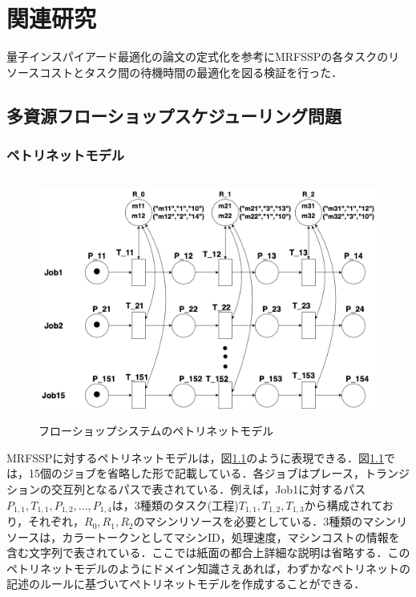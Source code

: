\chapter{関連研究}
\label{chap:poordirection}
量子インスパイアード最適化の論文\cite{shinjo}の定式化を参考にMRFSSPの各タスクのリソースコストとタスク間の待機時間の最適化を図る検証を行った．
\section{多資源フローショップスケジューリング問題}

\subsection{ペトリネットモデル}

\begin{figure}[H]
    \centering
    \includegraphics[width=0.8\linewidth, height=8cm]{./images/fsp.png}
    \caption{フローショップシステムのペトリネットモデル}
    \label{fig:fig1}
\end{figure}

MRFSSPに対するペトリネットモデルは，図\ref{fig:fig1}のように表現できる．図\ref{fig:fig1}では，15個のジョブを省略した形で記載している．各ジョブはプレース，トランジションの交互列となるパスで表されている．例えば，Job1に対するパス$P_{1,1}, T_{1,1}, P_{1,2}, ..., P_{1,4}$は，3種類のタスク(工程)$T_{1,1}, T_{1,2}, T_{1,3}$から構成されており，それぞれ，$R_0, R_1, R_2$のマシンリソースを必要としている．3種類のマシンリソースは，カラートークンとしてマシンID，処理速度，マシンコストの情報を含む文字列で表されている．ここでは紙面の都合上詳細な説明は省略する．このペトリネットモデルのようにドメイン知識さえあれば，わずかなペトリネットの記述のルールに基づいてペトリネットモデルを作成することができる．

